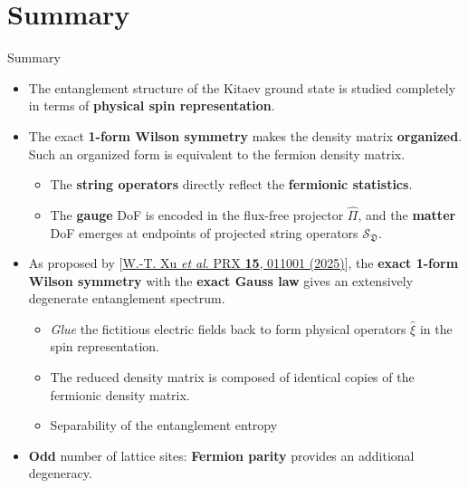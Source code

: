 \documentclass[professionalfont,
                xcolor=dvipsnames]{beamer}
\begin{document}
\section{Summary}
\begin{frame}{Summary}
    \begin{itemize}
        \item The entanglement structure of the Kitaev ground state is studied completely in terms of \textbf{physical spin representation}.
        \item The exact \textbf{1-form Wilson symmetry} makes the density matrix \textbf{organized}. Such an organized form is equivalent to the fermion density matrix.
        \begin{itemize}
            \item The \textbf{string operators} directly reflect the \textbf{fermionic statistics}.
            \item The \textbf{gauge} DoF is encoded in the flux-free projecto\textbf{}r $\hat{\Pi}$, and the \textbf{matter} DoF emerges at endpoints of projected string operators $\mathcal{S}_{\mathfrak{D}}$. 
        \end{itemize}

        \item As proposed by [\href{https://doi.org/10.1103/PhysRevX.15.011001}{\footnotesize W.-T. Xu \textit{et al}. PRX \textbf{15}, 011001 (2025)}], the \textbf{exact 1-form Wilson symmetry} with the \textbf{exact Gauss law} gives an extensively degenerate entanglement spectrum.
        \begin{itemize}
            \item \textit{Glue} the fictitious electric fields back to form physical operators $\hat{\xi}$ in the spin representation.
            \item The reduced density matrix is composed of identical copies of the fermionic density matrix.
            \item Separability of the entanglement entropy
        \end{itemize}

        \item \textbf{Odd} number of lattice sites: \textbf{Fermion parity} provides an additional degeneracy.
    \end{itemize}
\end{frame}
\end{document}
